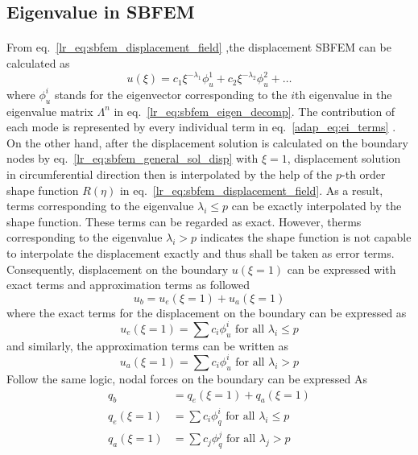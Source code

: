 
\subsection{Eigenvalue in SBFEM}
\paragraph{}
From eq.~\ref{lr_eq:sbfem_displacement_field} ,the displacement SBFEM can be calculated as
\begin{equation}
    u(\xi) = c_1 \xi ^{-\lambda_1} \phi_u^1
            +c_2 \xi ^{-\lambda_2} \phi_u^2
            +\dots
\label{adap_eq:ei_terms}
\end{equation}
where $\phi_u^i$ stands for the eigenvector corresponding to the $i$th eigenvalue in the eigenvalue matrix $\Lambda^{n}$ in eq.~\ref{lr_eq:sbfem_eigen_decomp}.
The contribution of each mode is represented by every individual term in eq.~\ref{adap_eq:ei_terms} \cite{Deeks2002}.
On the other hand, after the displacement solution is calculated on the boundary nodes by eq.~\ref{lr_eq:sbfem_general_sol_disp} with $\xi=1$, displacement solution in circumferential direction then is interpolated by the help of the $p$-th order shape function $R(\eta)$ in eq.~\ref{lr_eq:sbfem_displacement_field}.
As a result, terms corresponding to the eigenvalue $\lambda_i \leq p$ can be exactly interpolated by the shape function.
These terms can be regarded as exact.
However, therms corresponding to the eigenvalue $\lambda_i > p$ indicates the shape function is not capable to interpolate the displacement exactly and thus shall be taken as error terms.
Consequently, displacement on the boundary $u(\xi=1)$ can be expressed with exact terms and approximation terms as followed
\begin{equation}
    u_b = u_e (\xi=1) + u_a(\xi=1)
\end{equation}
where the exact terms for the displacement on the boundary can be expressed as
\begin{equation}
    u_e (\xi=1) = \sum c_i \phi_u^i \text{   for all  } \lambda_i \leq p
\end{equation}
and similarly, the approximation terms can be written as
\begin{equation}
    u_a (\xi=1) = \sum c_i \phi_u^i \text{   for all  } \lambda_i > p
\end{equation}
Follow the same logic, nodal forces on the boundary can be expressed As
\begin{equation}
    \begin{aligned}
        q_b &= q_e(\xi=1) + q_a(\xi=1) \\
        q_e(\xi=1) &= \sum c_i \phi_q^i \text{   for all  } \lambda_i \leq p \\
        q_a(\xi=1) &= \sum c_j \phi_q^j \text{   for all  } \lambda_j > p \\
    \end{aligned}
\end{equation}
